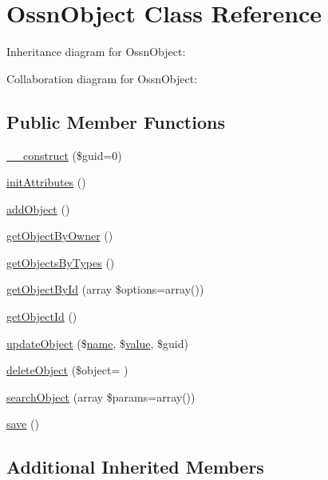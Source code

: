 \hypertarget{class_ossn_object}{}\section{Ossn\+Object Class Reference}
\label{class_ossn_object}


Inheritance diagram for Ossn\+Object\+:


Collaboration diagram for Ossn\+Object\+:
\subsection*{Public Member Functions}
\begin{DoxyCompactItemize}
\item 
\hyperlink{class_ossn_object_a9af3669c46ee61ad247b7eb606cce9df}{\+\_\+\+\_\+construct} (\$guid=0)
\item 
\hyperlink{class_ossn_object_a5fee6794de13185987b790fce43d0883}{init\+Attributes} ()
\item 
\hyperlink{class_ossn_object_a1ca074928989238a2b58eb2782d3d984}{add\+Object} ()
\item 
\hyperlink{class_ossn_object_af88aebe9014ae4e5c804f4ac53111125}{get\+Object\+By\+Owner} ()
\item 
\hyperlink{class_ossn_object_ab6d4864953b243d501b3d3e0b90ac808}{get\+Objects\+By\+Types} ()
\item 
\hyperlink{class_ossn_object_a4e0363c63932a7f163d4bd79ba947c6e}{get\+Object\+By\+Id} (array \$options=array())
\item 
\hyperlink{class_ossn_object_a2b8331c5da70a3c47701bdfc3b54b656}{get\+Object\+Id} ()
\item 
\hyperlink{class_ossn_object_ada23f0004598560ca364290560087a89}{update\+Object} (\$\hyperlink{user_8php_a765af5e9671743530143a6d3670fd9a6}{name}, \$\hyperlink{fullpage_2plugin_8min_8js_ac56c57897e10f699d124e0103921aa20}{value}, \$guid)
\item 
\hyperlink{class_ossn_object_ab6e2932b2d1573a170f8c386615173ed}{delete\+Object} (\$object= \textquotesingle{}\textquotesingle{})
\item 
\hyperlink{class_ossn_object_aa0f93181fd6961561e24ff4b2099ffee}{search\+Object} (array \$params=array())
\item 
\hyperlink{class_ossn_object_afc8a3c62679cf00ade9f15fb2a6d6132}{save} ()
\end{DoxyCompactItemize}
\subsection*{Additional Inherited Members}



